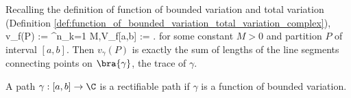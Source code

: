 %
%
%
%
%
%
%
%
%

Recalling the definition of function of bounded variation and total variation (Definition \ref{def:function_of_bounded_variation_total_variation_complex}),
\be
v_f(P) := \sum^n_{k=1} \leq M,\qquad V_f[a,b] := \sup{}.
\ee
for some constant $M>0$ and partition $P$ of interval $[a,b]$. Then $v_\gamma(P)$ is exactly the sum of lengths of the line segments connecting points on $\bra{\gamma}$, the trace of $\gamma$.

\begin{definition}\label{def:rectifiable_path_complex}
A path $\gamma:[a,b]\to \C$ is a rectifiable path if $\gamma$ is a function of bounded variation.
\end{definition}

